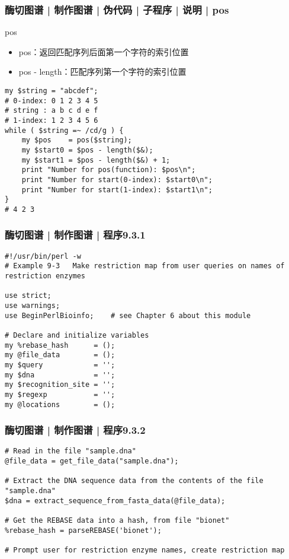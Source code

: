 \begin{frame}[fragile]
  \frametitle{酶切图谱 | 制作图谱 | 伪代码 | 子程序 | 说明 | \alert{pos}}
  \begin{block}{pos}
    \begin{itemize}
      \item pos：返回匹配序列后面第一个字符的索引位置
      \item pos - length：匹配序列第一个字符的索引位置
    \end{itemize}
  \end{block}
  \pause
\begin{lstlisting}[basicstyle=\small\tt,numberstyle=\footnotesize]
my $string = "abcdef";
# 0-index: 0 1 2 3 4 5
# string : a b c d e f
# 1-index: 1 2 3 4 5 6
while ( $string =~ /cd/g ) {
    my $pos    = pos($string);
    my $start0 = $pos - length($&);
    my $start1 = $pos - length($&) + 1;
    print "Number for pos(function): $pos\n";
    print "Number for start(0-index): $start0\n";
    print "Number for start(1-index): $start1\n";
}
# 4 2 3
\end{lstlisting}
\end{frame}

\begin{frame}[fragile]
  \frametitle{酶切图谱 | 制作图谱 | 程序9.3.1}
\begin{lstlisting}[firstnumber=1,basicstyle=\small\tt,numberstyle=\footnotesize]
#!/usr/bin/perl -w
# Example 9-3   Make restriction map from user queries on names of restriction enzymes

use strict;
use warnings;
use BeginPerlBioinfo;    # see Chapter 6 about this module

# Declare and initialize variables
my %rebase_hash      = ();
my @file_data        = ();
my $query            = '';
my $dna              = '';
my $recognition_site = '';
my $regexp           = '';
my @locations        = ();
\end{lstlisting}
\end{frame}

\begin{frame}[fragile]
  \frametitle{酶切图谱 | 制作图谱 | 程序9.3.2}
\begin{lstlisting}[firstnumber=17]
# Read in the file "sample.dna"
@file_data = get_file_data("sample.dna");

# Extract the DNA sequence data from the contents of the file "sample.dna"
$dna = extract_sequence_from_fasta_data(@file_data);

# Get the REBASE data into a hash, from file "bionet"
%rebase_hash = parseREBASE('bionet');

# Prompt user for restriction enzyme names, create restriction map
\end{lstlisting}
\end{frame}

